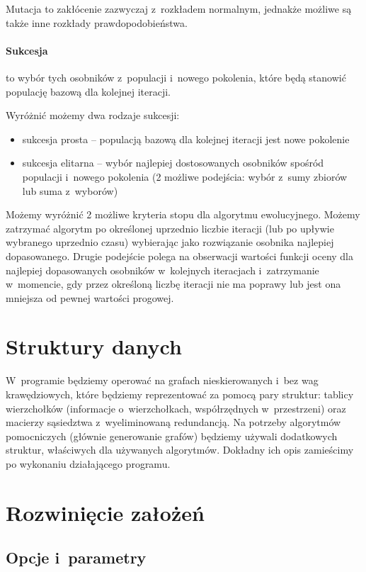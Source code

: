 \documentclass[a4paper,onecolumn,oneside,12pt]{mwart}
\begin{document}
Mutacja to zakłócenie zazwyczaj z~rozkładem normalnym, jednakże możliwe są
także inne rozkłady prawdopodobieństwa.

\paragraph{Sukcesja} to wybór tych osobników z~populacji i~nowego
pokolenia, które będą stanowić populację bazową dla kolejnej iteracji.

Wyróżnić możemy dwa rodzaje sukcesji:
\begin{itemize}
	\item sukcesja prosta -- populacją bazową dla kolejnej iteracji jest nowe pokolenie
	\item sukcesja elitarna -- wybór najlepiej dostosowanych osobników
		spośród populacji i~nowego pokolenia (2 możliwe podejścia: wybór
		z~sumy zbiorów lub suma z~wyborów)
\end{itemize}

Możemy wyróżnić 2 możliwe kryteria stopu dla algorytmu ewolucyjnego. Możemy
zatrzymać algorytm po określonej uprzednio liczbie iteracji (lub po upływie
wybranego uprzednio czasu) wybierając jako rozwiązanie osobnika najlepiej
dopasowanego. Drugie podejście polega na obserwacji wartości funkcji oceny
dla najlepiej dopasowanych osobników w~kolejnych iteracjach i~zatrzymanie
w~momencie, gdy przez określoną liczbę iteracji nie ma poprawy lub jest ona
mniejsza od pewnej wartości progowej.

\section{Struktury danych}

W~programie będziemy operować na grafach nieskierowanych i~bez wag
krawędziowych, które będziemy reprezentować za pomocą pary struktur:
tablicy wierzchołków (informacje o~wierzchołkach, współrzędnych
w~przestrzeni) oraz macierzy sąsiedztwa z~wyeliminowaną redundancją. Na
potrzeby algorytmów pomocniczych (głównie generowanie grafów) będziemy
używali dodatkowych struktur, właściwych dla używanych algorytmów. Dokładny
ich opis zamieścimy po wykonaniu działającego programu.

\section{Rozwinięcie założeń}

\subsection{Opcje i~parametry}
\end{document}
